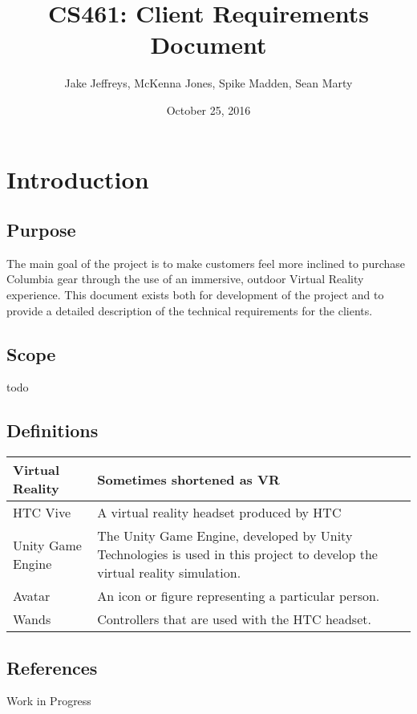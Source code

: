\documentclass[10pt, oneside,onecolumn,draftclsnofoot]{IEEEtran}
\title{CS461: Client Requirements Document}
\author{Jake Jeffreys, McKenna Jones, Spike Madden, Sean Marty}
\date{October 25, 2016}
\begin{document}
\begin{titlepage}
\maketitle
\vspace{3cm}

\end{titlepage}

\tableofcontents
\section{Introduction}

\subsection{Purpose}
The main goal of the project is to make customers feel more inclined to purchase
Columbia gear through the use of an immersive, outdoor Virtual Reality
experience. This document exists both for development of the project and to provide a detailed description of the technical requirements for the clients.

\subsection{Scope}
todo

\subsection{Definitions}
\begin{center}
	\begin{tabular}{| m{3cm} | m{9cm} |}
		\hline
		Virtual Reality & Sometimes shortened as VR \\
		\hline
		HTC Vive & A virtual reality headset produced by HTC \\
		\hline
		Unity Game Engine & The Unity Game Engine, developed by Unity Technologies
    is used in this project to develop the virtual reality simulation. \\
    \hline
    Avatar & An icon or figure representing a particular person. \\
    \hline
    Wands & Controllers that are used with the HTC headset. \\
    \hline
		\end{tabular}
\end{center}

\subsection{References}
Work in Progress
\end{document}

